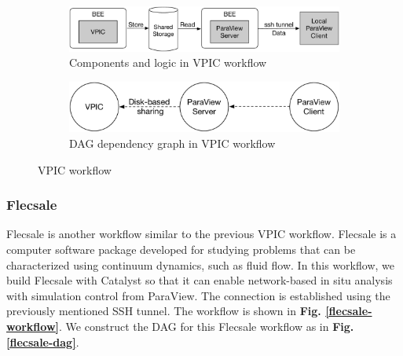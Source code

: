\begin{figure}
\centering
   \begin{subfigure}[b]{0.4\textwidth}
   \includegraphics[width=0.9\linewidth]{figures/vpic.pdf}
   \caption{Components and logic in VPIC workflow}
   \label{vpic-workflow} 
\end{subfigure}

\begin{subfigure}[b]{0.4\textwidth}
   \includegraphics[width=0.9\linewidth]{figures/vpic-dag.pdf}
   \caption{DAG dependency graph in VPIC workflow}
   \label{vpic-dag}
\end{subfigure}
\caption{VPIC workflow}

\end{figure}


\subsubsection{Flecsale}
Flecsale \cite{flecsale} is another workflow similar to the previous VPIC workflow. Flecsale is a computer software package developed for studying problems that can be characterized using continuum dynamics, such as fluid flow. In this workflow, we build Flecsale with Catalyst so that it can enable network-based in situ analysis with simulation control from ParaView. The connection is established using the previously mentioned SSH tunnel. The workflow is shown in \textbf{Fig. \ref{flecsale-workflow}}. We construct the DAG for this Flecsale workflow as in \textbf{Fig. \ref{flecsale-dag}}.

